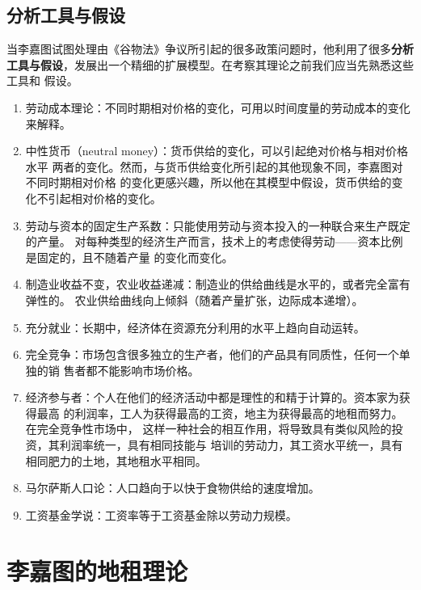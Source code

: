 \subsection{分析工具与假设}

当李嘉图试图处理由《谷物法》争议所引起的很多政策问题时，他利用了很多\textbf{分析
  工具与假设}，发展出一个精细的扩展模型。在考察其理论之前我们应当先熟悉这些工具和
假设。

\begin{enumerate}
\item 劳动成本理论：不同时期相对价格的变化，可用以时间度量的劳动成本的变化来解释。

\item 中性货币（neutral money）：货币供给的变化，可以引起绝对价格与相对价格水平
  两者的变化。然而，与货币供给变化所引起的其他现象不同，李嘉图对不同时期相对价格
  的变化更感兴趣，所以他在其模型中假设，货币供给的变化不引起相对价格的变化。

\item 劳动与资本的固定生产系数：只能使用劳动与资本投入的一种联合来生产既定的产量。
  对每种类型的经济生产而言，技术上的考虑使得劳动——资本比例是固定的，且不随着产量
  的变化而变化。

\item 制造业收益不变，农业收益递减：制造业的供给曲线是水平的，或者完全富有弹性的。
  农业供给曲线向上倾斜（随着产量扩张，边际成本递增）。

\item 充分就业：长期中，经济体在资源充分利用的水平上趋向自动运转。

\item 完全竞争：市场包含很多独立的生产者，他们的产品具有同质性，任何一个单独的销
  售者都不能影响市场价格。

\item 经济参与者：个人在他们的经济活动中都是理性的和精于计算的。资本家为获得最高
  的利润率，工人为获得最高的工资，地主为获得最高的地租而努力。在完全竞争性市场中，
  这样一种社会的相互作用，将导致具有类似风险的投资，其利润率统一，具有相同技能与
  培训的劳动力，其工资水平统一，具有相同肥力的土地，其地租水平相同。

\item 马尔萨斯人口论：人口趋向于以快于食物供给的速度增加。

\item 工资基金学说：工资率等于工资基金除以劳动力规模。
\end{enumerate}

\section{李嘉图的地租理论}

